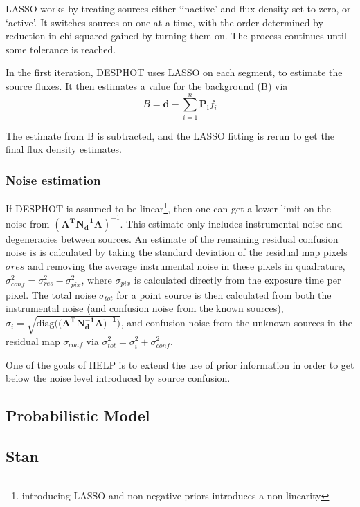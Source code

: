 \documentclass[useAMS,usenatbib]{mn2e}
\begin{document}
LASSO works by treating sources either `inactive' and flux density set to zero, or `active'. It switches sources on one at a time, with the order determined by reduction in chi-squared gained by turning them on. The process continues until some tolerance is reached.

In the first iteration, DESPHOT uses LASSO on each segment, to estimate the source fluxes. It then estimates a value for the background (B) via
\begin{equation}
B = \mathbf{d} - \sum\limits_{i=1}^n \mathbf{P_i}f_i
\end{equation} 

The estimate from B is subtracted, and the LASSO fitting is rerun to get the final flux density estimates.
\subsubsection{Noise estimation}
If DESPHOT is assumed to be linear\footnote{introducing LASSO and non-negative priors introduces a non-linearity}, then one can get a lower limit on the noise from $(\mathbf{A^TN_d^{-1}A})^{-1}$. This estimate only includes instrumental noise and degeneracies between sources. An estimate of the remaining residual confusion noise is is calculated by taking the standard deviation of the residual map pixels $\sigma{res}$ and removing the average instrumental noise in these pixels in quadrature, $\sigma^2_{conf} = \sigma^2_{res} - \sigma^2_{pix}$, where $\sigma_{pix}$ is calculated directly from the exposure time per pixel. The total noise $\sigma_{tot}$ for a point source is then calculated from both the instrumental noise (and confusion noise from the known sources), $\sigma_{i} = \sqrt{\mathrm{diag}((\mathbf{A^TN^{-1}_dA)^{-1})}}$, and confusion noise from the unknown sources in the residual map $\sigma_{conf}$ via $\sigma^2_{tot} = \sigma^2_{i} + \sigma^2_{conf}$. 
 
 
 One of the goals of HELP is to extend the use of prior information in order to get below the noise level introduced by source confusion.
\subsection{Probabilistic Model}


\subsection{Stan}
\end{document}
